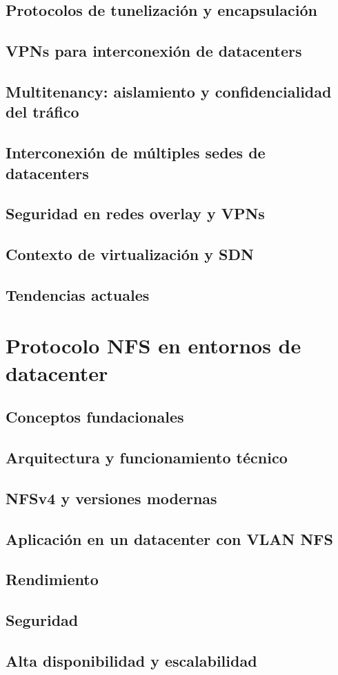 \documentclass[11pt, a4paper]{book}
\begin{document}
	\section{Protocolos de tunelización y encapsulación}
	
	\section{VPNs para interconexión de datacenters}
	
	\section{Multitenancy: aislamiento y confidencialidad del tráfico}
	
	\section{Interconexión de múltiples sedes de datacenters}
	
	\section{Seguridad en redes overlay y VPNs}
	
	\section{Contexto de virtualización y SDN}
	
	\section{Tendencias actuales}
	
	
	\chapter{Protocolo NFS en entornos de datacenter}
	\section{Conceptos fundacionales}
	
	\section{Arquitectura y funcionamiento técnico}
	
	\section{NFSv4 y versiones modernas}
	
	\section{Aplicación en un datacenter con VLAN NFS}
	
	\section{Rendimiento}
	
	\section{Seguridad}
	
	\section{Alta disponibilidad y escalabilidad}
	
\end{document}
